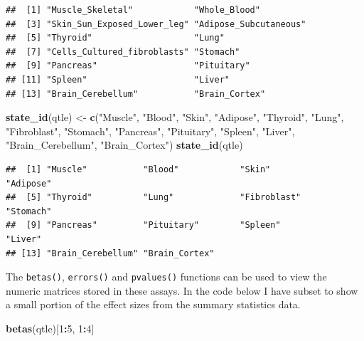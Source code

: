 \documentclass[
]{article}
\newenvironment{Shaded}{\begin{snugshade}}{\end{snugshade}}
\newcommand{\DecValTok}[1]{\textcolor[rgb]{0.00,0.00,0.81}{#1}}
\newcommand{\FunctionTok}[1]{\textcolor[rgb]{0.13,0.29,0.53}{\textbf{#1}}}
\newcommand{\NormalTok}[1]{#1}
\newcommand{\OtherTok}[1]{\textcolor[rgb]{0.56,0.35,0.01}{#1}}
\newcommand{\SpecialCharTok}[1]{\textcolor[rgb]{0.81,0.36,0.00}{\textbf{#1}}}
\newcommand{\StringTok}[1]{\textcolor[rgb]{0.31,0.60,0.02}{#1}}
\begin{document}
\begin{verbatim}
##  [1] "Muscle_Skeletal"            "Whole_Blood"               
##  [3] "Skin_Sun_Exposed_Lower_leg" "Adipose_Subcutaneous"      
##  [5] "Thyroid"                    "Lung"                      
##  [7] "Cells_Cultured_fibroblasts" "Stomach"                   
##  [9] "Pancreas"                   "Pituitary"                 
## [11] "Spleen"                     "Liver"                     
## [13] "Brain_Cerebellum"           "Brain_Cortex"
\end{verbatim}

\begin{Shaded}
\begin{Highlighting}[]
\FunctionTok{state\_id}\NormalTok{(qtle) }\OtherTok{\textless{}{-}}  \FunctionTok{c}\NormalTok{(}\StringTok{"Muscle"}\NormalTok{, }\StringTok{"Blood"}\NormalTok{, }\StringTok{"Skin"}\NormalTok{, }\StringTok{"Adipose"}\NormalTok{, }\StringTok{"Thyroid"}\NormalTok{, }\StringTok{"Lung"}\NormalTok{,}
    \StringTok{"Fibroblast"}\NormalTok{, }\StringTok{"Stomach"}\NormalTok{, }\StringTok{"Pancreas"}\NormalTok{, }\StringTok{"Pituitary"}\NormalTok{, }\StringTok{"Spleen"}\NormalTok{, }\StringTok{"Liver"}\NormalTok{, }
    \StringTok{"Brain\_Cerebellum"}\NormalTok{, }\StringTok{"Brain\_Cortex"}\NormalTok{)}
\FunctionTok{state\_id}\NormalTok{(qtle)}
\end{Highlighting}
\end{Shaded}

\begin{verbatim}
##  [1] "Muscle"           "Blood"            "Skin"             "Adipose"         
##  [5] "Thyroid"          "Lung"             "Fibroblast"       "Stomach"         
##  [9] "Pancreas"         "Pituitary"        "Spleen"           "Liver"           
## [13] "Brain_Cerebellum" "Brain_Cortex"
\end{verbatim}

\normalsize

The \texttt{betas()}, \texttt{errors()} and \texttt{pvalues()} functions
can be used to view the numeric matrices stored in these assays. In the
code below I have subset to show a small portion of the effect sizes
from the summary statistics data.

\footnotesize

\begin{Shaded}
\begin{Highlighting}[]
\FunctionTok{betas}\NormalTok{(qtle)[}\DecValTok{1}\SpecialCharTok{:}\DecValTok{5}\NormalTok{, }\DecValTok{1}\SpecialCharTok{:}\DecValTok{4}\NormalTok{]}
\end{Highlighting}
\end{Shaded}
\end{document}
